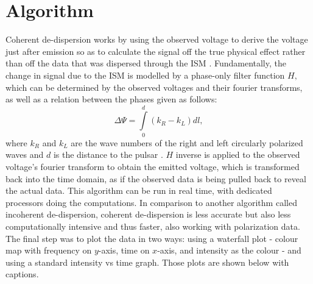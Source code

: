 \documentclass{article}
\begin{document}
\section{Algorithm}
Coherent de-dispersion works by using the observed voltage to derive the voltage just after emission so as to calculate the signal off the true physical effect rather than off the data that was dispersed through the ISM \cite{2012hpa..book.....L}. Fundamentally, the change in signal due to the ISM is modelled by a phase-only filter function $H,$ which can be determined by the observed voltages and their fourier transforms, as well as a relation between the phases given as follows:
\begin{equation*}
    \Delta \Psi = \int\limits_0^d (k_R-k_L) dl,
\end{equation*}
where $k_R$ and $k_L$ are the wave numbers of the right and left circularly polarized waves and $d$ is the distance to the pulsar \cite{2012hpa..book.....L}.
$H$ inverse is applied to the observed voltage's fourier transform to obtain the emitted voltage, which is transformed back into the time domain, as if the observed data is being pulled back to reveal the actual data. This algorithm can be run in real time, with dedicated processors doing the computations. In comparison to another algorithm called incoherent de-dispersion, coherent de-dispersion is less accurate but also less computationally intensive and thus faster, also working with polarization data.\\

The final step was to plot the data in two ways: using a waterfall plot - colour map with frequency on $y$-axis, time on $x$-axis, and intensity as the colour - and using a standard intensity vs time graph. Those plots are shown below with captions.\\
\end{document}
